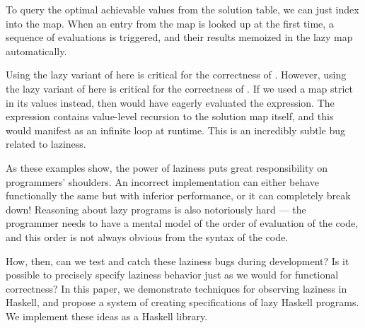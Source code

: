 \documentclass[acmsmall,review]{acmart}\settopmatter{}
\begin{document}
To query the optimal achievable values from the solution table, we can
just index into the map. When an entry from the map is looked up at
the first time, a sequence of evaluations is triggered, and their
results memoized in the lazy map automatically.

Using the lazy variant of  here is critical for the correctness
of .
However, using the lazy variant of  here is critical for the
correctness of . If we used a map strict in its values
instead, then  would have eagerly evaluated the 
expression. The  expression contains value-level recursion to
the solution map itself, and this would manifest as an infinite loop
at runtime. This is an incredibly subtle bug related to laziness.

As these examples show, the power of laziness puts great
responsibility on programmers' shoulders. An incorrect implementation
can either behave functionally the same but with inferior performance,
or it can completely break down! Reasoning about lazy programs is also
notoriously hard --- the programmer needs to have a mental model of the
order of evaluation of the code, and this order is not always obvious
from the syntax of the code.


How, then, can we test and catch these laziness bugs during development? Is it
possible to precisely specify laziness behavior just as we would for functional
correctness?
%
In this paper, we demonstrate techniques for observing laziness in Haskell, and
propose a system of creating specifications of lazy Haskell programs. We
implement these ideas as a Haskell library.
\end{document}
